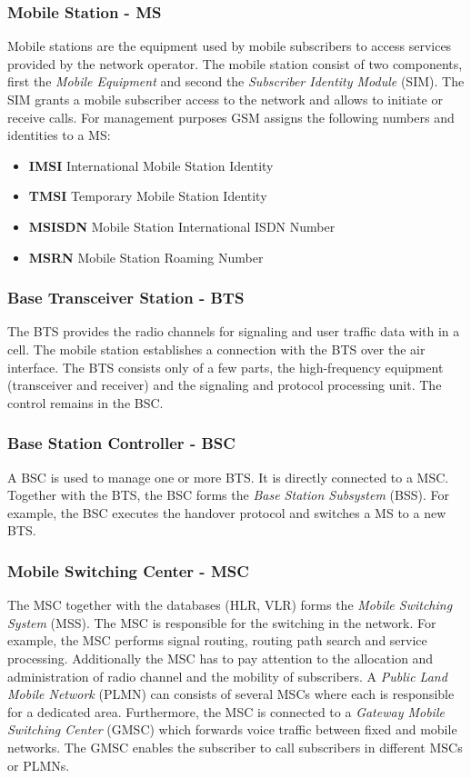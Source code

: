 \documentclass[master,english]{hgbthesis}
\begin{document}
\subsubsection{Mobile Station - MS}
Mobile stations are the equipment used by mobile subscribers to access services provided by the network operator. The mobile station consist of two components, first the \emph{Mobile Equipment} and second the \emph{Subscriber Identity Module} (SIM). The SIM grants a mobile subscriber access to the network and allows to initiate or receive calls.
For management purposes GSM assigns the following numbers and identities to a MS:
\begin{itemize}
	\item \textbf{IMSI} International Mobile Station Identity
	\item \textbf{TMSI} Temporary Mobile Station Identity
	\item \textbf{MSISDN} Mobile Station International ISDN Number
	\item \textbf{MSRN} Mobile Station Roaming Number
\end{itemize}
\subsubsection{Base Transceiver Station - BTS}
The BTS provides the radio channels for signaling and user traffic data with in a cell. The mobile station establishes a connection with the BTS over the air interface. The BTS consists only of a few parts, the high-frequency equipment (transceiver and receiver) and the signaling and protocol processing unit. The control remains in the BSC.
\subsubsection{Base Station Controller - BSC}
A BSC is used to manage one or more BTS. It is directly connected to a MSC. Together with the BTS, the BSC forms the \emph{Base Station Subsystem} (BSS). For example, the BSC executes the handover protocol and switches a MS to a new BTS.
\subsubsection{Mobile Switching Center - MSC}
The MSC together with the databases (HLR, VLR) forms the \emph{Mobile Switching System} (MSS). The MSC is responsible for the switching in the network. For example, the MSC performs signal routing, routing path search and service processing. Additionally the MSC has to pay attention to the allocation and administration of radio channel and the mobility of subscribers. A \emph{Public Land Mobile Network} (PLMN) can consists of several MSCs where each is responsible for a dedicated area.
Furthermore, the MSC is connected to a \emph{Gateway Mobile Switching Center} (GMSC) which forwards voice traffic between fixed and mobile networks. The GMSC enables the subscriber to call subscribers in different MSCs or PLMNs.
\end{document}
